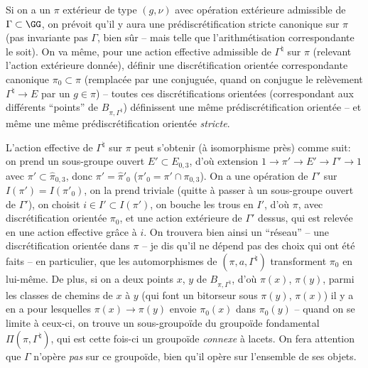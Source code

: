 Si on a un $\pi$ extérieur de type $(g,\nu)$ avec opération
extérieure admissible de $\Gamma\subset \GG$, on prévoit qu'il y
aura une prédiscrétification stricte canonique sur $\pi$
(pas invariante pas $\Gamma$, bien s\^ur -- mais telle que
l'arithmétisation correspondante le soit).  On va même,
pour une action effective admissible de $\Gamma^\natural$ sur $\pi$
(relevant l'action extérieure donnée), définir une
discrétification orientée correspondante canonique $\pi_0
\subset \pi$ (remplacée par une conjuguée, quand on conjugue
le relèvement $\Gamma^\natural\to E$ par
un $g\in\pi$) -- toutes ces discrétifications orientées
(correspondant aux différents ``points'' de $B_{\pi,\Gamma^\natural}$)
définissent une même prédiscrétification orientée --
et même une même prédiscrétification orientée {\it
stricte}.

L'action effective de $\Gamma^\natural$ sur $\pi$ peut s'obtenir
(à isomorphisme près) comme suit: on prend un sous-groupe
ouvert $E'\subset E_{0,3}$, d'où extension
$1\to\pi'\to E'\to\Gamma'
\to 1$ avec $\pi'\subset \hat\pi_{0,3}$, donc
$\pi'=\hat\pi'_0$ ($\pi'_0=\pi'\cap\pi_{0,3}$).  On a une
opération de $\Gamma'$ sur $I(\pi')=I(\pi'_0)$, on la
prend triviale (quitte à passer à un sous-groupe
ouvert de $\Gamma'$), on choisit $i\in I'\subset  I(\pi')$,
on bouche les trous en $I'$, d'où $\pi$, avec
discrétification orientée $\pi_0$, et une action 
extérieure de $\Gamma'$ dessus, qui est relevée en une
action effective gr\^ace à $i$.  On trouvera bien ainsi un
``réseau'' -- une discrétification orientée dans $\pi$ -- je dis qu'il
ne dépend pas des choix qui ont été faits -- en particulier,
que les automorphismes de $(\pi,a,\Gamma^\natural)$ transforment
$\pi_0$ en lui-même.  De plus, si on a deux points $x$,
$y$ de $B_{\pi,\Gamma^\natural}$, d'où $\pi(x)$,
$\pi(y)$, parmi les classes de chemins de $x$ à $y$
(qui font un bitorseur sous $\pi(y)$, $\pi(x)$) il y a
en a pour lesquelles $\pi(x)\to\pi(y)$ envoie
$\pi_0(x)$ dans $\pi_0(y)$ -- quand on se limite à
ceux-ci, on trouve un sous-groupoïde du groupoïde
fondamental $\Pi(\pi,\Gamma^\natural)$, qui est cette fois-ci
un groupoïde {\it connexe} à lacets.  On fera attention
que $\Gamma$ n'opère {\it pas} sur ce groupoïde,
bien qu'il opère sur l'ensemble de ses objets.
















